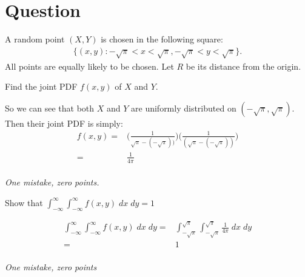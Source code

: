 \section*{Question}

A random point $(X,Y)$ is chosen in the following square:
\begin{align*}
    \{(x, y) : -\sqrt{\pi} < x < \sqrt{\pi}, -\sqrt{\pi} < y < \sqrt{\pi} \}.
\end{align*}
All points are equally likely to be chosen. Let $R$ be its distance from the origin.
\begin{exercise}[0.5]
Find the joint PDF $f(x,y)$ of $X$ and $Y$.
\begin{solution}
So we can see that both $X$ and $Y$ are uniformly distributed on $(-\sqrt{\pi}, \sqrt{\pi})$. Then their joint PDF is simply:
\begin{align*}
    f(x,y) =& \Big(\frac{1}{\sqrt{\pi} - (-\sqrt{\pi}))} \Big) \Big(\frac{1}{(\sqrt{\pi} - (-\sqrt{\pi}))} \Big) \\
    =& \frac{1}{4 \pi}
\end{align*} \\
\textit{One mistake, zero points.}
\end{solution}
\end{exercise}

\begin{exercise}[0.5]
Show that $\int_{-\infty}^\infty \int_{-\infty}^\infty f(x,y) \; dx \; dy = 1$
\begin{solution}
 \begin{align*}
      \int_{-\infty}^\infty \int_{-\infty}^\infty f(x,y) \; dx \; dy =& \int_{-\sqrt{\pi}}^{\sqrt{\pi}} \int_{-\sqrt{\pi}}^{\sqrt{\pi}} \frac{1}{4\pi} \; dx \; dy \\
      =& 1
    \end{align*} \\
    \textit{One mistake, zero points}
\end{solution}

\end{exercise}

